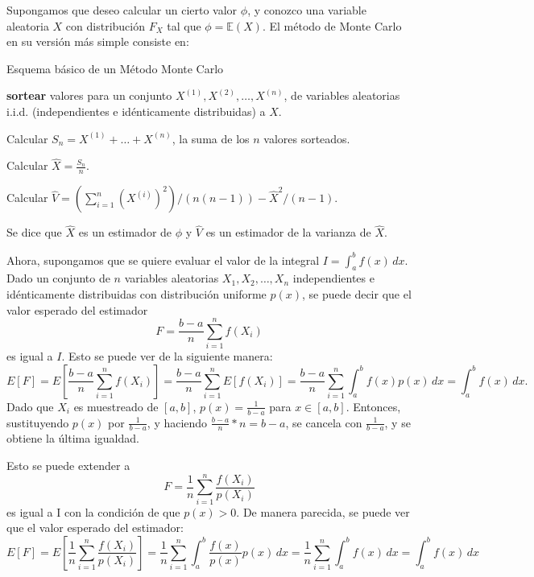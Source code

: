 \documentclass{article}
\begin{document}
Supongamos que deseo calcular un cierto valor $\phi$, y conozco una variable aleatoria $X$ con distribución $F_X$ tal que $\phi = \mathbb{E}(X)$. El método de Monte Carlo en su versión más simple consiste en:

\begin{algorithm}
\caption{Esquema básico de un Método Monte Carlo}
\begin{algorithmic}[1]

\State \textbf{sortear} valores para un conjunto $X^{(1)}, X^{(2)}, \dots, X^{(n)}$, de variables aleatorias i.i.d. (independientes e idénticamente distribuidas) a $X$.

\State Calcular $S_n = X^{(1)} + \dots + X^{(n)}$, la suma de los $n$ valores sorteados.

\State Calcular $\hat{X} = \frac{S_n}{n}$.

\State Calcular $\hat{V} = \left(\sum_{i=1}^{n} (X^{(i)})^2\right) / (n(n - 1)) - \hat{X}^2 / (n - 1)$.

\end{algorithmic}
\end{algorithm}

Se dice que $\hat{X}$ es un estimador de $\phi$ y $\hat{V}$ es un estimador de la varianza de $\hat{X}$.

Ahora, supongamos que se quiere evaluar el valor de la integral $I = \int_{a}^{b} f(x) \,dx$. Dado un conjunto de $n$ variables aleatorias $X_1, X_2, \dots, X_n$ independientes e idénticamente distribuidas con distribución uniforme $p(x)$, se puede decir que el valor esperado del estimador
$$F = \frac{b-a}{n} \sum_{i=1}^{n} f(X_i)$$
es igual a $I$. Esto se puede ver de la siguiente manera:
$$E[F] = E\left[\frac{b-a}{n} \sum_{i=1}^{n} f(X_i)\right] = \frac{b-a}{n} \sum_{i=1}^{n} E[f(X_i)] = \frac{b-a}{n} \sum_{i=1}^{n} \int_{a}^{b} f(x) p(x) \,dx = \int_{a}^{b} f(x) \,dx.$$
Dado que $X_i$ es muestreado de $[a,b]$, $p(x) = \frac{1}{b-a}$ para $x \in [a,b]$. Entonces, sustituyendo $p(x)$ por $\frac{1}{b-a}$, y haciendo $\frac{b-a}{n} * n = b-a$, se cancela con $\frac{1}{b-a}$, y se obtiene la última igualdad.

Esto se puede extender a
$$ F = \frac{1}{n} \sum_{i=1}^{n} \frac{f(X_i)}{p(X_i)}$$
es igual a I con la condición de que $p(x) > 0$. De manera parecida, se puede ver que el valor esperado del estimador:
$$E[F] = E\left[\frac{1}{n} \sum_{i=1}^{n} \frac{f(X_i)}{p(X_i)}\right] = \frac{1}{n} \sum_{i=1}^{n} \int_{a}^{b} \frac{f(x)}{p(x)} p(x) \,dx = \frac{1}{n} \sum_{i=1}^{n} \int_{a}^{b} f(x) \,dx = \int_{a}^{b} f(x) \,dx$$
\end{document}
